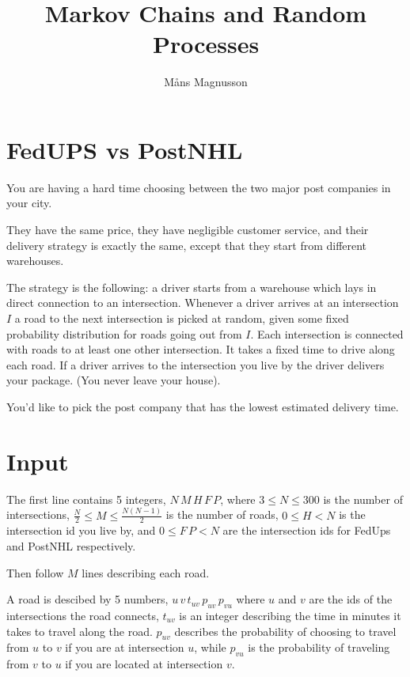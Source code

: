 \documentclass{tufte-handout}
\title{\sf Markov Chains and Random Processes}
\date{\GITAuthorDate}
\author{M\aa ns Magnusson}
\begin{document}
\maketitle
{}

\section{FedUPS vs PostNHL}

You are having a hard time choosing between the two major post companies in your city.

\medskip

They have the same price, they have negligible customer service, 
and their delivery strategy is exactly the same, except that they start from different warehouses.

The strategy is the following: a driver starts from a warehouse which lays in direct connection to an intersection. 
Whenever a driver arrives at an intersection $I$ a road to the next intersection is picked at random, given some fixed probability distribution for roads going out from $I$. 
Each intersection is connected with roads to at least one other intersection. It takes a fixed time to drive along each road. 
If a driver arrives to the intersection you live by the driver delivers your package. (You never leave your house).

\medskip

You'd like to pick the post company that has the lowest estimated delivery time.


\section*{Input}
The first line contains 5 integers, $N\, M\, H\, F\, P$, where $3 \leq N \leq 300$ is the number of intersections, 
$\frac{N}{2} \leq M \leq \frac{N(N-1)}{2}$ is the number of roads, $0 \leq H < N$ is the intersection id you live by, and 
$0 \leq F\, P < N$ are the intersection ids for FedUps and PostNHL respectively. 

\medskip

Then follow $M$ lines describing each road.

\medskip

A road is descibed by 5 numbers, $u\, v\, t_{uv}\, p_{uv} \, p_{vu}$ where $u$ and $v$ are the ids of the intersections the road connects, 
$t_{uv}$ is an integer describing the time in minutes it takes to travel along the road. 
$p_{uv}$ describes the probability of choosing to travel from $u$ to $v$ if you are at intersection $u$, 
while $p_{vu}$ is the probability of traveling from $v$ to $u$ if you are located at intersection $v$.
\end{document}
